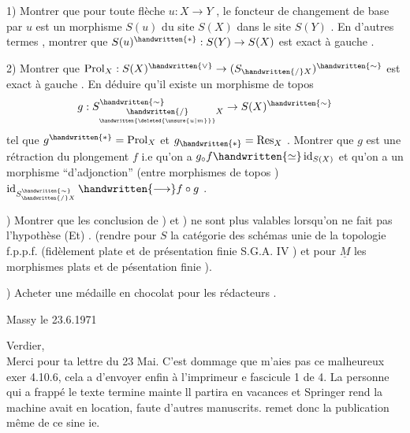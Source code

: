 1) Montrer que pour toute flèche \(u:X\to Y\) , le foncteur de changement de base par \(u\) est un morphisme  \(S(u)\) du site \(S(X)\) dans le site \(S(Y)\) . En d'autres termes , montrer que \(S(u)^{\handwritten{*}}:S(Y)\to S(X)\) est exact à gauche .

2) Montrer que \(\operatorname{Prol}_X:S(X)^{\handwritten{\vee}}\to(S_{\handwritten{/}X})^{\handwritten{\sim}}\) est exact à gauche . En déduire qu'il existe un morphisme de topos
\[
g:S^{\handwritten{\sim}}_{\underset{\handwritten{\deleted{\unsure{u|m}}}}{\handwritten{/}}X}\to S(X)^{\handwritten{\sim}}
\]
tel que \(g^{\handwritten{*}}=\operatorname{Prol}_X\) et \(g_{\handwritten{*}}=\operatorname{Res}_X\) . Montrer que \(g\) est une rétraction du plongement \(f\) i.e qu'on a \(g_{\circ}f\handwritten{\simeq}\operatorname{id}_{S(X)}\) et qu'on a un morphisme ``d'adjonction'' (entre morphismes de topos ) \(\operatorname{id}_{S^{\handwritten{\sim}}_{\handwritten{/}X}}\handwritten{\longrightarrow} f\circ g\) .

) Montrer que les conclusion de ) et ) ne sont plus valables lorsqu'on ne fait pas l'hypothèse (Et) . (rendre pour \(S\) la catégorie des schémas unie de la topologie f.p.p.f. (fidèlement plate et de présentation finie \handwritten{[} S.G.A.  IV \handwritten{]} ) et pour \(\underline{M}\) les morphismes  plats et de pésentation finie ).

) Acheter une médaille en chocolat pour les rédacteurs .

\begin{flushright}
Massy le 23.6.1971\\
\end{flushright}
 Verdier,\\

Merci pour ta lettre du 23 Mai. C'est dommage que   m'aies pas  ce malheureux exer 4.10.6, cela a  d'envoyer enfin à l'imprimeur e fascicule 1 de  4. La personne qui a frappé le texte termine mainte ll partira en vacances et Springer rend la machine  avait en location, faute d'autres manuscrits.  remet donc la publication même de ce  sine ie.


